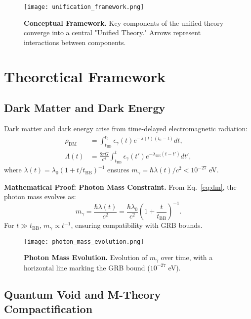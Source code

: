 \documentclass[12pt, a4paper]{article}
\begin{document}
\begin{figure}[h]
\centering
\texttt{[image: unification\_framework.png]}
\caption{\textbf{Conceptual Framework.} Key components of the unified theory converge into a central "Unified Theory." Arrows represent interactions between components.}
\label{fig:framework}
\end{figure}

\section*{Theoretical Framework}

\subsection*{Dark Matter and Dark Energy}

Dark matter and dark energy arise from time-delayed electromagnetic radiation:
\begin{align}
\rho_{\text{DM}} &= \int_{t_{\text{BB}}}^{t_0} \epsilon_{\gamma}(t) e^{-\lambda(t)(t_0 - t)} dt, \label{eq:dm} \\
\Lambda(t) &= \frac{8\pi G}{c^4} \int_{t_{\text{BB}}}^{t} \epsilon_{\gamma}(t') e^{-\lambda_{\text{DE}}(t - t')} dt', \label{eq:de}
\end{align}
where \(\lambda(t) = \lambda_0 \left(1 + t/t_{\text{BB}}\right)^{-1}\) ensures \(m_\gamma = \hbar \lambda(t)/c^2 < 10^{-27}\) eV.

\textbf{Mathematical Proof: Photon Mass Constraint.} From Eq.~\eqref{eq:dm}, the photon mass evolves as:
\[
m_\gamma = \frac{\hbar \lambda(t)}{c^2} = \frac{\hbar \lambda_0}{c^2} \left(1 + \frac{t}{t_{\text{BB}}}\right)^{-1}.
\]
For \(t \gg t_{\text{BB}}\), \(m_\gamma \propto t^{-1}\), ensuring compatibility with GRB bounds.

\begin{figure}[h]
\centering
\texttt{[image: photon\_mass\_evolution.png]}
\caption{\textbf{Photon Mass Evolution.} Evolution of \(m_\gamma\) over time, with a horizontal line marking the GRB bound (\(10^{-27}\) eV).}
\label{fig:photon_mass}
\end{figure}

\subsection*{Quantum Void and M-Theory Compactification}
\end{document}
